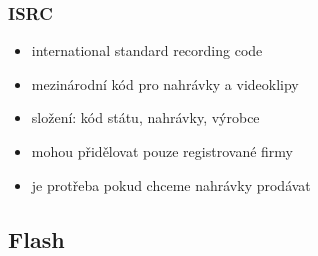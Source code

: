 \documentclass[a4paper,12pt]{article}
\providecommand{\tightlist}{%
\setlength{\itemsep}{0pt}\setlength{\parskip}{0pt}}
\begin{document}
\subsubsection{ISRC}

\begin{itemize}
  \tightlist
  \item international standard recording code
  \item mezinárodní kód pro nahrávky a videoklipy
  \item složení: kód státu, nahrávky, výrobce
  \item mohou přidělovat pouze registrované firmy
  \item je protřeba pokud chceme nahrávky prodávat
\end{itemize}

\subsection{Flash}
\end{document}
